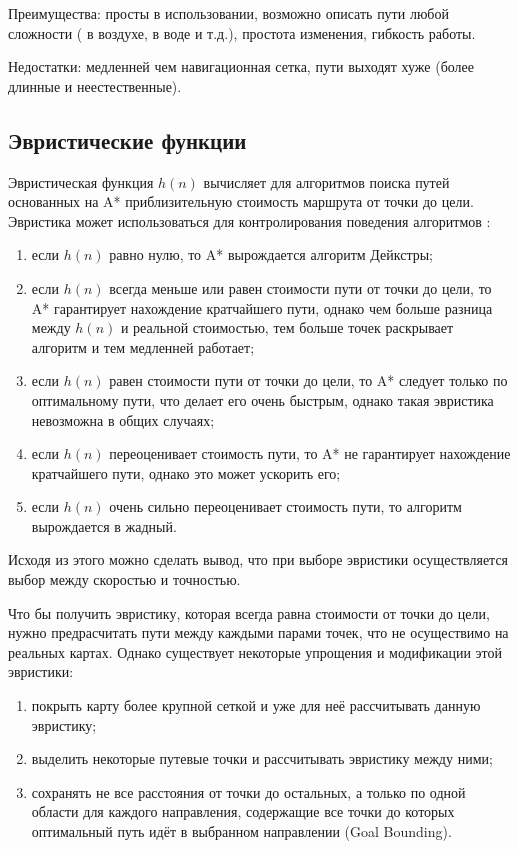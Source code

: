 Преимущества: просты в использовании, возможно описать пути любой сложности ( в воздухе, в воде и т.д.), простота изменения, гибкость работы.

Недостатки: медленней чем навигационная сетка, пути выходят хуже (более длинные и неестественные).

\subsection{Эвристические функции}

Эвристическая функция $h(n)$ вычисляет для алгоритмов поиска путей основанных на A* приблизительную стоимость маршрута от точки до цели. Эвристика может использоваться для контролирования поведения алгоритмов \cite{HEURISTICS}:

\begin{enumerate}
	\item если $h(n)$ равно нулю, то A* вырождается алгоритм Дейкстры;
	\item если $h(n)$ всегда меньше или равен стоимости пути от точки до цели, то A* гарантирует нахождение кратчайшего пути, однако чем больше разница между $h(n)$ и реальной стоимостью, тем больше точек раскрывает алгоритм и тем медленней работает;
	\item если $h(n)$ равен стоимости пути от точки до цели, то A* следует только по оптимальному пути, что делает его очень быстрым, однако такая эвристика невозможна в общих случаях;
	\item если $h(n)$ переоценивает стоимость пути, то A* не гарантирует нахождение кратчайшего пути, однако это может ускорить его;
	\item если $h(n)$ очень сильно переоценивает стоимость пути, то алгоритм вырождается в жадный.
\end{enumerate}

Исходя из этого можно сделать вывод, что при выборе эвристики осуществляется выбор между скоростью и точностью.

Что бы получить эвристику, которая всегда равна стоимости от точки до цели, нужно предрасчитать пути между каждыми парами точек, что не осуществимо на реальных картах. Однако существует некоторые упрощения и модификации этой эвристики:

\begin{enumerate}
	\item покрыть карту более крупной сеткой и уже для неё рассчитывать данную эвристику;
	\item выделить некоторые путевые точки и рассчитывать эвристику между ними;
	\item сохранять не все расстояния от точки до остальных, а только по одной области для каждого направления, содержащие все точки до которых оптимальный путь идёт в выбранном направлении (Goal Bounding).
\end{enumerate}

